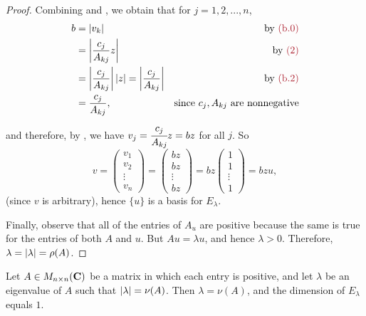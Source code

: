 \begin{proof}

Combining  and , we obtain that for \(j = 1, 2, ..., n\),
\begin{align*}
    b & = \abs{v_k} & \text{by \MAROON{(b.0)}} \\
      & = \left| \frac{c_j}{A_{kj}} z \right| & \text{by \MAROON{(2)}}\\
      & = \left| \frac{c_j}{A_{kj}} \right| \abs{z} = \left| \frac{c_j}{A_{kj}} \right| & \text{by \MAROON{(b.2)}} \\
      & = \frac{c_j}{A_{kj}}, & \text{since \(c_j, A_{kj}\) are nonnegative}
\end{align*}
and therefore, by , we have \(v_j = \cfrac{c_j}{A_{kj}} z = b z\) for all \(j\).
So
\[
    v = \begin{pmatrix} v_1 \\ v_2 \\ \vdots \\ v_n \end{pmatrix}
    = \begin{pmatrix} bz \\ bz \\ \vdots \\ bz \end{pmatrix}
    = bz \begin{pmatrix} 1 \\ 1 \\ \vdots \\ 1 \end{pmatrix}
    = bzu,
\]
(since \(v\) is arbitrary), hence \(\{ u \}\) is a basis for \(E_{\lambda}\).

Finally, observe that all of the entries of \(A_u\) are positive because the same is true for the entries of both \(A\) and \(u\).
But \(Au = \lambda u\), and hence \(\lambda > 0\).
Therefore, \(\lambda = \lvert\lambda\rvert = \rho(A)\).
\end{proof}

\begin{corollary} \label{corollary 5.17.1}
Let \(A \in M_{n \times n}(\mathbf{C})\) be a matrix in which each entry is positive, and let \(\lambda\) be an eigenvalue of \(A\) such that \(\lvert\lambda\rvert = \nu(A)\).
Then \(\lambda = \nu(A)\), and the dimension of \(E_{\lambda}\) equals \(1\).
\end{corollary}

